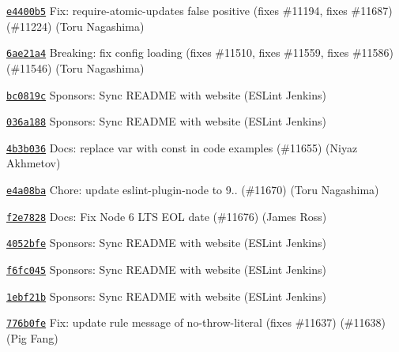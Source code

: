 \begin{DoxyItemize}
\item \href{https://github.com/eslint/eslint/commit/e4400b5a02602bba7f67ea4cb874c231903c546a}{\texttt{ {\ttfamily e4400b5}}} Fix\+: require-\/atomic-\/updates false positive (fixes \#11194, fixes \#11687) (\#11224) (Toru Nagashima)
\item \href{https://github.com/eslint/eslint/commit/6ae21a4bfe5a1566f787fbad798182a524b96d28}{\texttt{ {\ttfamily 6ae21a4}}} Breaking\+: fix config loading (fixes \#11510, fixes \#11559, fixes \#11586) (\#11546) (Toru Nagashima)
\item \href{https://github.com/eslint/eslint/commit/bc0819c94aad14f7fad3cbc2338ea15658b0f272}{\texttt{ {\ttfamily bc0819c}}} Sponsors\+: Sync README with website (ESLint Jenkins)
\item \href{https://github.com/eslint/eslint/commit/036a188143677384f720ff18071fc4206c54500b}{\texttt{ {\ttfamily 036a188}}} Sponsors\+: Sync README with website (ESLint Jenkins)
\item \href{https://github.com/eslint/eslint/commit/4b3b036d6240cdbc2d52e670de36b1117f5f34d7}{\texttt{ {\ttfamily 4b3b036}}} Docs\+: replace {\ttfamily var} with {\ttfamily const} in code examples (\#11655) (Niyaz Akhmetov)
\item \href{https://github.com/eslint/eslint/commit/e4a08bae82788136b6899262cb8b9ed4fe7964e6}{\texttt{ {\ttfamily e4a08ba}}} Chore\+: update eslint-\/plugin-\/node to 9.. (\#11670) (Toru Nagashima)
\item \href{https://github.com/eslint/eslint/commit/f2e78281d057f38b18cc160e81ed1bb54a5b9565}{\texttt{ {\ttfamily f2e7828}}} Docs\+: Fix Node 6 LTS EOL date (\#11676) (James Ross)
\item \href{https://github.com/eslint/eslint/commit/4052bfebb87850b901f2eb8687edfbe49c01d68f}{\texttt{ {\ttfamily 4052bfe}}} Sponsors\+: Sync README with website (ESLint Jenkins)
\item \href{https://github.com/eslint/eslint/commit/f6fc0450e749707bed44118c1205fb4e73e65628}{\texttt{ {\ttfamily f6fc045}}} Sponsors\+: Sync README with website (ESLint Jenkins)
\item \href{https://github.com/eslint/eslint/commit/1ebf21bc18769956366110bb62ff677639e633ae}{\texttt{ {\ttfamily 1ebf21b}}} Sponsors\+: Sync README with website (ESLint Jenkins)
\item \href{https://github.com/eslint/eslint/commit/776b0fe3d93da958517ac7752682091f22eb30b4}{\texttt{ {\ttfamily 776b0fe}}} Fix\+: update rule message of no-\/throw-\/literal (fixes \#11637) (\#11638) (Pig Fang)

\end{DoxyItemize}
